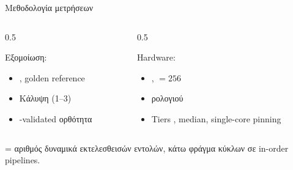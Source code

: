 \begin{frame}{Μεθοδολογία μετρήσεων}
  \begin{columns}[T,onlytextwidth]
    \begin{column}{0.5\textwidth}
      \begin{block}{Εξομοίωση: }
        \begin{itemize}
          \item {}, golden reference
          \item Κάλυψη  (1--3)
          \item {}-validated ορθότητα
        \end{itemize}
      \end{block}
    \end{column}
    \begin{column}{0.5\textwidth}
      \begin{block}{Hardware: }
        \begin{itemize}
          \item {}, \VLEN${}=256$
          \item {} ρολογιού
          \item Tiers , median, single-core pinning
        \end{itemize}
      \end{block}
    \end{column}
  \end{columns}
  \vfill
  \begin{center}\footnotesize
    \instret = αριθμός δυναμικά εκτελεσθεισών εντολών, κάτω φράγμα κύκλων σε in-order pipelines.
  \end{center}
\end{frame}
